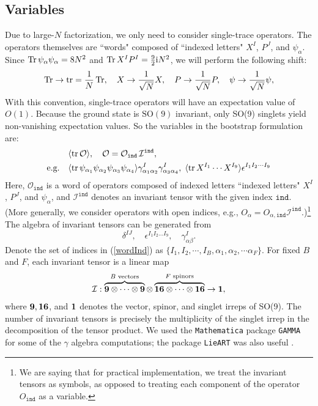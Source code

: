 \documentclass[11pt]{article}
\def\la{\label}
\def\nref#1{(\ref{#1})}
\renewcommand{\ev}[1]{\langle #1 \rangle} %
\def\i{\mathrm{i}}
\begin{document}
\subsection{Variables}\label{sec: variables}
Due to large-$N$ factorization, we only need to consider single-trace operators. The operators themselves are ``words" composed of ``indexed letters" $X^I$, $P^J$, and $\psi_{\alpha}$. 
Since $\Tr \psi_\alpha \psi_\alpha=8 N^2$ and $\Tr X^I P^I = \frac{9}{2} \i N^2$, we will perform the following shift:
\begin{equation}\label{largeNscaling}
    \Tr \rightarrow \tr = \frac{1}{N}\Tr, \quad
    X\rightarrow\frac{1}{\sqrt{N}} X, \quad  P\rightarrow\frac{1}{\sqrt{N}} P,\quad \psi\rightarrow\frac{1}{\sqrt{N}} \psi, 
\end{equation}
With this convention, single-trace operators will have an expectation value of $O(1)$.
Because the ground state is $\text{SO}(9)$ invariant, only SO(9) singlets yield non-vanishing expectation values. So the variables in the bootstrap formulation are:
\begin{align} \la{wordInd}
 &\langle\tr \mathcal{O}  \rangle, \quad  \mathcal{O} =\mathcal{O}_{\texttt{ind}} \,\mathcal{I}^{\texttt{ind}},\\  
\nonumber \text{e.g.} \quad 
  & \ev{ \tr \psi_{\alpha_1} \psi_{\alpha_2} \psi_{\alpha_3} \psi_{\alpha_4}} \gamma^{I}_{\alpha_1 \alpha_2} \gamma^{I}_{\alpha_3 \alpha_4 }, \; \ev{ \tr X^{I_1} \cdots X^{I_9}} \epsilon^{I_1 I_2 \cdots I_9}
\end{align}
Here, $\mathcal{O}_{\texttt{ind}}$ is a word of operators composed of  indexed letters ``indexed letters" $X^I$, $P^J$, and $\psi_{\alpha}$, and $\mathcal{I}^{\texttt{ind}}$ denotes an invariant tensor with the given index $\texttt{ind}$. (More generally, we  consider operators with open indices, e.g., $O_\alpha = O_{\alpha, \texttt{ind}} \mathcal{I}^{\texttt{ind}}$.)\footnote{We are saying that for practical implementation, we treat the invariant tensors as symbols, as opposed to treating each component of the operator $O_\texttt{ind}$ as a variable.}
The algebra of invariant tensors can be generated from
\begin{equation}
        \delta^{IJ}, \quad \epsilon^{I_1 I_2 \ldots I_9}, \quad \gamma^I_{\alpha\beta}.
\end{equation}
Denote the set of indices in \nref{wordInd} as $\{ I_1, I_2, \cdots, I_B, \alpha_1, \alpha_2, \cdots \alpha_F \} $. For fixed $B$ and $F$, each invariant tensor is a linear map 
\begin{align}
   \mathcal{I} :  \overbrace{{\bf 9} \otimes \cdots \otimes {\bf 9}}^{B \text{ vectors}} \otimes  \overbrace{{\bf 16} \otimes \cdots \otimes {\bf 16}}^{F \text{ spinors} }  \to {\bf 1},
\end{align} where ${\bf 9}, {\bf 16}$, and ${\bf 1}$ denotes the vector, spinor, and singlet irreps of SO(9). The number of invariant tensors is precisely the multiplicity of the singlet irrep in the decomposition of the tensor product. We used the \texttt{Mathematica} package \texttt{GAMMA} \cite{Gran:2001yh} for some of the $\gamma$ algebra computations; the package \texttt{LieART} was also useful \cite{Feger:2019tvk}.
\end{document}
